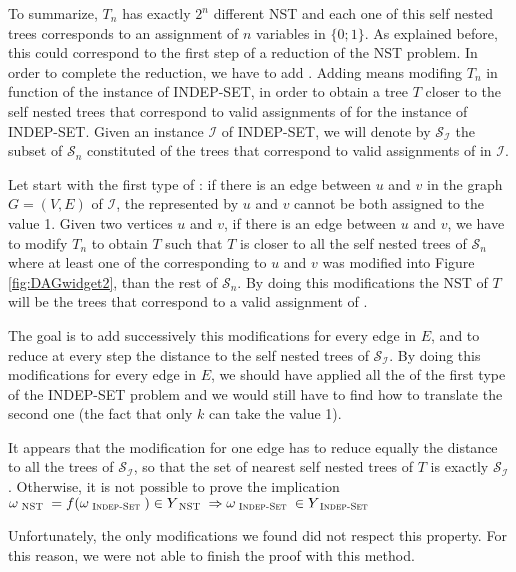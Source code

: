 To summarize, $T_{n}$ has exactly $2^{n}$ different NST and each one
of this self nested trees corresponds to an assignment of $n$
variables in $\{0;1\}$. As explained before, this could correspond to
the first step of a reduction of the NST problem. In order to complete
the reduction, we have to add \constraints. Adding \constraints means
modifing $T_{n}$ in function of the instance of INDEP-SET, in order to
obtain a tree $T$ closer to the self nested trees that correspond to valid
assignments of \variables for the instance of INDEP-SET. Given an
instance $\mathcal{I}$ of INDEP-SET, we will denote
by $\mathcal{S}_{\mathcal{I}}$ the subset of $\mathcal{S}_{n}$
constituted of the trees that correspond to valid assignments of
\variables in $\mathcal{I}$.
 
Let start with the first type of \constraint: if there is an edge
between $u$ and $v$ in the graph $G=(V,E)$ of $\mathcal{I}$, the
\variables represented by $u$ and $v$ cannot be both assigned to the
value 1. Given two vertices $u$ and $v$, if there is an edge between
$u$ and $v$, we have to modify $T_{n}$ to obtain $T$ such that $T$ is
closer to all the self nested trees of $\mathcal{S}_{n}$ where at
least one of the \widgets corresponding to $u$ and $v$ was modified
into Figure \ref{fig:DAGwidget2}, than the rest of
$\mathcal{S}_{n}$. By doing this modifications the NST of $T$ will be
the trees that correspond to a valid assignment of \variables.

The goal is to add successively this modifications for every edge in
$E$, and to reduce at every step the distance to the self nested trees
of $\mathcal{S}_{\mathcal{I}}$. By doing this modifications for every
edge in $E$, we should have applied all the \constraints of the first
type of the INDEP-SET problem and we would still have to find how to
translate the second one (the fact that only $k$ \variables can take
the value 1).

It appears that the modification for one edge has to reduce equally
the distance to all the trees of $\mathcal{S}_{\mathcal{I}}$, so that
the set of nearest self nested trees of $T$ is exactly
$\mathcal{S}_{\mathcal{I}}$. Otherwise, it is not possible to prove
the implication
$\omega_{\textsc{ NST }} = f(\omega_{\textsc{ Indep-Set }}) \in
Y_{\textsc{ NST }} \Rightarrow \omega_{\textsc{ Indep-Set }} \in
Y_{\textsc{ Indep-Set }}$

Unfortunately, the only modifications we found did not respect this
property. For this reason, we were not able to finish the proof with
this method.
 
